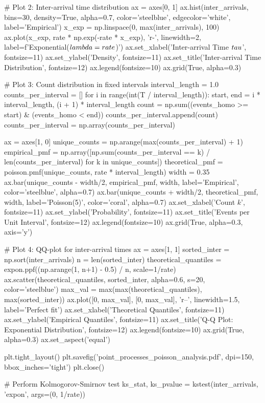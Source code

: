 \documentclass[a4paper, 11pt]{article}
\begin{document}
\begin{pycode}
# Plot 2: Inter-arrival time distribution
ax = axes[0, 1]
ax.hist(inter_arrivals, bins=30, density=True, alpha=0.7, color='steelblue',
        edgecolor='white', label='Empirical')
x_exp = np.linspace(0, max(inter_arrivals), 100)
ax.plot(x_exp, rate * np.exp(-rate * x_exp), 'r-', linewidth=2,
        label=f'Exponential($\\lambda = {rate}$)')
ax.set_xlabel('Inter-arrival Time $\\tau$', fontsize=11)
ax.set_ylabel('Density', fontsize=11)
ax.set_title('Inter-arrival Time Distribution', fontsize=12)
ax.legend(fontsize=10)
ax.grid(True, alpha=0.3)

# Plot 3: Count distribution in fixed intervals
interval_length = 1.0
counts_per_interval = []
for i in range(int(T / interval_length)):
    start, end = i * interval_length, (i + 1) * interval_length
    count = np.sum((events_homo >= start) & (events_homo < end))
    counts_per_interval.append(count)
counts_per_interval = np.array(counts_per_interval)

ax = axes[1, 0]
unique_counts = np.arange(max(counts_per_interval) + 1)
empirical_pmf = np.array([np.sum(counts_per_interval == k) / len(counts_per_interval)
                          for k in unique_counts])
theoretical_pmf = poisson.pmf(unique_counts, rate * interval_length)
width = 0.35
ax.bar(unique_counts - width/2, empirical_pmf, width, label='Empirical',
       color='steelblue', alpha=0.7)
ax.bar(unique_counts + width/2, theoretical_pmf, width, label='Poisson(5)',
       color='coral', alpha=0.7)
ax.set_xlabel('Count $k$', fontsize=11)
ax.set_ylabel('Probability', fontsize=11)
ax.set_title('Events per Unit Interval', fontsize=12)
ax.legend(fontsize=10)
ax.grid(True, alpha=0.3, axis='y')

# Plot 4: QQ-plot for inter-arrival times
ax = axes[1, 1]
sorted_inter = np.sort(inter_arrivals)
n = len(sorted_inter)
theoretical_quantiles = expon.ppf((np.arange(1, n+1) - 0.5) / n, scale=1/rate)
ax.scatter(theoretical_quantiles, sorted_inter, alpha=0.6, s=20, color='steelblue')
max_val = max(max(theoretical_quantiles), max(sorted_inter))
ax.plot([0, max_val], [0, max_val], 'r--', linewidth=1.5, label='Perfect fit')
ax.set_xlabel('Theoretical Quantiles', fontsize=11)
ax.set_ylabel('Empirical Quantiles', fontsize=11)
ax.set_title('Q-Q Plot: Exponential Distribution', fontsize=12)
ax.legend(fontsize=10)
ax.grid(True, alpha=0.3)
ax.set_aspect('equal')

plt.tight_layout()
plt.savefig('point_processes_poisson_analysis.pdf', dpi=150, bbox_inches='tight')
plt.close()

# Perform Kolmogorov-Smirnov test
ks_stat, ks_pvalue = kstest(inter_arrivals, 'expon', args=(0, 1/rate))
\end{pycode}
\end{document}
